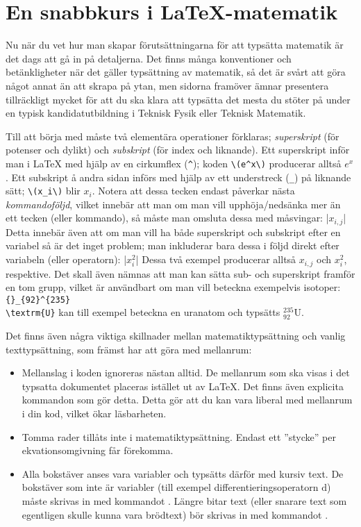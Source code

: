 \documentclass[10pt,../../a4.tex]{subfiles}
\begin{document}
\nopagebreak
\section{En snabbkurs i \LaTeX-matematik}
Nu när du vet hur man skapar förutsättningarna för att typsätta matematik
är det dags att gå in på detaljerna. Det finns många konventioner
och betänkligheter när det gäller typsättning av matematik, så det är
svårt att göra något annat än att skrapa på ytan, men sidorna framöver
ämnar presentera tillräckligt mycket för att du ska klara att typsätta
det mesta du stöter på under en typisk kandidatutbildning i Teknisk Fysik
eller Teknisk Matematik.

\label{sec:3:subscript}
Till att börja med måste två elementära operationer förklaras;
\emph{superskript} (för potenser och dylikt) och \emph{subskript} (för 
index och liknande). Ett superskript inför man i \LaTeX{} med hjälp av
en cirkumflex (\verb|^|); koden \verb|\(e^x\)| producerar alltså \(e^x\).
Ett subskript å andra sidan införs med hjälp av ett understreck (\verb|_|)
på liknande sätt; \verb|\(x_i\)| blir \(x_i\). Notera att dessa tecken
endast påverkar nästa \emph{kommandoföljd}, vilket innebär att man om man
vill upphöja/nedsänka mer än ett tecken (eller kommando), så måste man
omsluta dessa med måsvingar:
\latex|\(x_{i,j}\)|
Detta innebär även att om man vill ha både superskript och subskript efter
en variabel så är det inget problem; man inkluderar bara dessa i följd
direkt efter variabeln (eller operatorn):
\latex|\(x_i^2\)|
Dessa två exempel producerar alltså \(x_{i,j}\) och \(x_i^2\), 
respektive. Det skall även nämnas att man kan sätta sub- och superskript
framför en tom grupp, vilket är användbart om man vill beteckna exempelvis
isotoper: \verb|{}_{92}^{235}|\\\verb|\textrm{U}| kan till exempel beteckna en uranatom
och typsätts \({}_{92}^{235}\textrm{U}\).

Det finns även några viktiga skillnader mellan matematiktypsättning och
vanlig texttypsättning, som främst har att göra med mellanrum:
\begin{itemize}
	\item Mellanslag i koden ignoreras nästan alltid. De mellanrum som ska
	visas i det typsatta dokumentet placeras istället ut av \LaTeX. Det
	finns även explicita kommandon som gör detta. Detta gör att du kan
	vara liberal med mellanrum i din kod, vilket ökar läsbarheten.
	
	\item Tomma rader tillåts inte i matematiktypsättning. Endast ett
	”stycke” per ekvationsomgivning får förekomma.
	
	\item Alla bokstäver anses vara variabler och typsätts därför med
	kursiv text. De bokstäver som inte är variabler (till exempel
	differentieringsoperatorn \(\mathrm{d}\)) måste skrivas in med 
	kommandot . Längre bitar text (eller snarare text
	som egentligen skulle kunna vara brödtext)
	bör skrivas in med kommandot .
\end{itemize}
\end{document}
